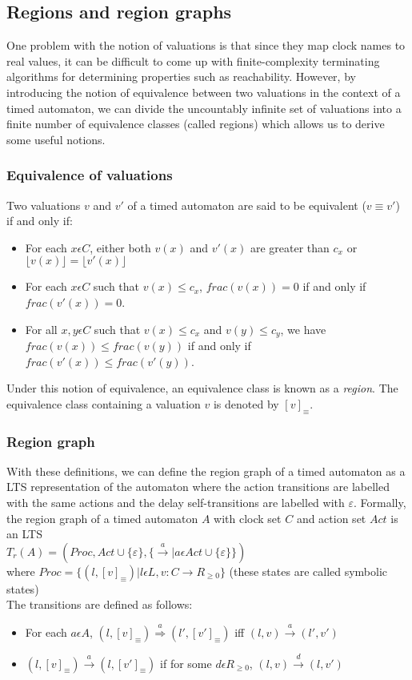 \documentclass{article}
\begin{document}
\subsection{Regions and region graphs}

One problem with the notion of valuations is that since they map clock
names to real values, it can be difficult to come up with finite-complexity
terminating algorithms for determining properties such as
reachability. However, by introducing the notion of equivalence
between two valuations in the context of a timed automaton, we can
divide the uncountably infinite set of valuations into a finite number
of equivalence classes (called regions) which allows us to derive some
useful notions.

\subsubsection{Equivalence of valuations}
Two valuations $v$ and $v'$ of
a timed automaton are said to be equivalent ($v \equiv v'$) if and
only if:
\begin{itemize}
\item For each $x \epsilon C$, either both $v(x)$ and $v'(x)$ are
  greater than $c_x$ or $\lfloor v(x) \rfloor = \lfloor v'(x)
  \rfloor$
\item For each $x \epsilon C$ such that $v(x) \le c_x$,
  $frac(v(x))=0$ if and only if $frac(v'(x))=0$.
\item For all $x,y \epsilon C$ such that $v(x) \le c_x$ and $v(y)
  \le c_y$, we have $frac(v(x)) \le frac(v(y))$ if and only if
  $frac(v'(x)) \le frac(v'(y))$.
\end{itemize}

Under this notion of equivalence, an equivalence class is known
as a \emph{region}. The equivalence class containing a valuation $v$
is denoted by $[v]_{\equiv}$.

\subsubsection{Region graph}
With these definitions, we can define the
region graph of a timed automaton as a LTS representation of the
automaton where the action transitions are labelled with the same
actions and the delay self-transitions are labelled with
$\varepsilon$.
Formally, the region graph of a timed automaton $A$ with clock set $C$
and action set $Act$ is an LTS\\
$T_r(A) = (Proc,Act \cup \{\varepsilon\}, \{\xrightarrow{a}|a \epsilon
Act \cup \{\varepsilon\}\})$\\
where $Proc = \{(l, [v]_{\equiv}) | l \epsilon L, v: C \rightarrow
R_{\ge 0}\}$ (these states are called symbolic states)\\
The transitions are defined as follows:
\begin{itemize}
\item For each $a \epsilon A$, $(l, [v]_{\equiv})
  \overset{a}{\Rightarrow} (l', [v']_{\equiv})$ iff $(l,v)
  \overset{a}{\rightarrow} (l', v')$
\item $(l, [v]_{\equiv}) \xrightarrow{a} (l, [v']_{\equiv})$ if
  for some $d \epsilon R_{\ge 0}$, $(l, v) \xrightarrow{d} (l,
  v')$
\end{itemize}
\end{document}
